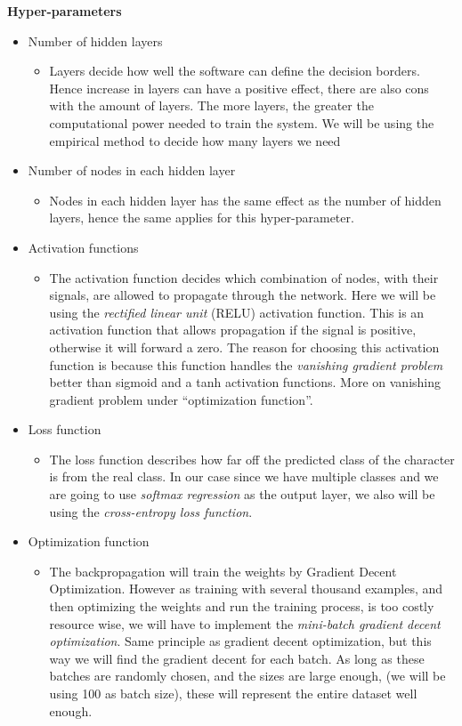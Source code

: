 \documentclass[Report.tex]{subfiles}
\begin{document}
  
  \begin{flushleft}
    \textbf{Hyper-parameters}
    \begin{itemize}
     \item{Number of hidden layers}
     \begin{itemize}
      \item{Layers decide how well the software can define the decision borders. Hence increase in layers can have a positive effect, there are also cons with the amount of layers. The more layers, the greater the computational power needed to train the system. We will be using the empirical method to decide how many layers we need}
     \end{itemize}
     \item{Number of nodes in each hidden layer}
     \begin{itemize}
      \item{Nodes in each hidden layer has the same effect as the number of hidden layers, hence the same applies for this hyper-parameter.}
     \end{itemize}
     \item{Activation functions}
     \begin{itemize}
      \item{The activation function decides which combination of nodes, with their signals, are allowed to propagate through the network. Here we will be using the \textit{rectified linear unit} (RELU) activation function. This is an activation function that allows propagation if the signal is positive, otherwise it will forward a zero. The reason for choosing this activation function is because this function handles the \textit{vanishing gradient problem} better than sigmoid and a tanh activation functions. More on vanishing gradient problem under ``optimization function''.}
     \end{itemize}
     \item{Loss function}
     \begin{itemize}
      \item{The loss function describes how far off the predicted class of the character is from the real class. In our case since we have multiple classes and we are going to use \textit{softmax regression} as the output layer, we also will be using the \textit{cross-entropy loss function}.}
     \end{itemize}
     \item{Optimization function}
     \begin{itemize}
      \item{The backpropagation will train the weights by Gradient Decent Optimization. However as training with several thousand examples, and then optimizing the weights and run the training process, is too costly resource wise, we will have to implement the \textit{mini-batch gradient decent optimization}. Same principle as gradient decent optimization, but this way we will find the gradient decent for each batch. As long as these batches are randomly chosen, and the sizes are large enough, (we will be using 100 as batch size), these will represent the entire dataset well enough.}

\end{itemize}
\end{itemize}
\end{flushleft}
\end{document}
